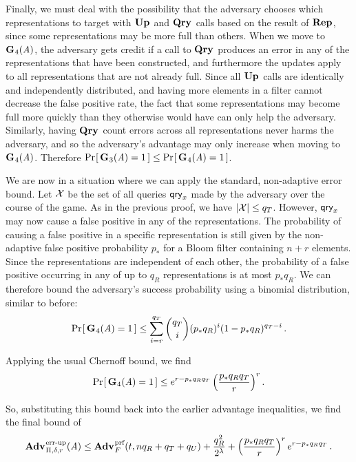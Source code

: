 Finally, we must deal with the possibility that the adversary chooses which representations to target with $\textup{\textbf{Up}}\hspace{0.5pt}$ and $\textup{\textbf{Qry}}\hspace{0.5pt}$ calls based on the result of $\textup{\textbf{Rep}}\hspace{0.5pt}$, since some representations may be more full than others. When we move to~$\textup{\textbf{G}}\hspace{0.5pt}_4(\mathit{A})$, the adversary gets credit if a call to $\textup{\textbf{Qry}}\hspace{0.5pt}$ produces an error in any of the representations that have been constructed, and furthermore the updates apply to all representations that are not already full. Since all $\textup{\textbf{Up}}\hspace{0.5pt}$ calls are identically and independently distributed, and having more elements in a filter cannot decrease the false positive rate, the fact that some representations may become full more quickly than they otherwise would have can only help the adversary. Similarly, having $\textup{\textbf{Qry}}\hspace{0.5pt}$ count errors across all representations never harms the adversary, and so the adversary's advantage may only increase when moving to~$\textup{\textbf{G}}\hspace{0.5pt}_4(\mathit{A})$. Therefore $\Pr\hspace{-1pt}\left[\,\textup{\textbf{G}}\hspace{0.5pt}_3(\mathit{A}) = 1\,\right] \le \Pr\hspace{-1pt}\left[\,\textup{\textbf{G}}\hspace{0.5pt}_4(\mathit{A}) = 1\,\right]$.

We are now in a situation where we can apply the standard, non-adaptive error bound. Let $\mathcal{X}$ be the set of all queries $\mathsf{qry}_x$ made by the adversary over the course of the game. As in the previous proof, we have $|\mathcal{X}| \le q_T$. However, $\mathsf{qry}_x$ may now cause a false positive in any of the representations. The probability of causing a false positive in a specific representation is still given by the non-adaptive false positive probability $p_*$ for a Bloom filter containing $n+r$ elements. Since the representations are independent of each other, the probability of a false positive occurring in any of up to $q_R$ representations is at most $p_*q_R$. We can therefore bound the adversary's success probability using a binomial distribution, similar to before:
\begin{equation}
   \Pr\hspace{-1pt}\left[\,\textup{\textbf{G}}\hspace{0.5pt}_4(\mathit{A})=1\,\right] \le
     \sum_{i=r}^{q_T} \binom{q_T}{i}(p_*q_R)^i(1-p_*q_R)^{q_T-i} \,.
\end{equation}

Applying the usual Chernoff bound, we find
\begin{equation}
   \Pr\hspace{-1pt}\left[\,\textup{\textbf{G}}\hspace{0.5pt}_4(\mathit{A})=1\,\right] \le
     e^{r-p_*q_Rq_T}\left(\frac{p_*q_Rq_T}{r}\right)^r.
\end{equation}

So, substituting this bound back into the earlier advantage inequalities, we find the final bound of
\begin{equation}
  \Adv{\errep}_{\Pi,\delta,r}(\advA) \leq
      \Adv{\prf}_F(t,nq_R+q_T+q_U) +
      \frac{q_R^2}{2^\lambda} +
      \left(\frac{p_*q_Rq_T}{r}\right)^re^{r-p_*q_Rq_T}
    \,.
\end{equation}